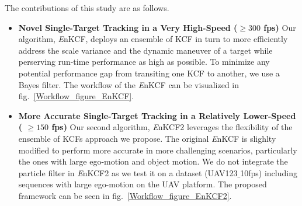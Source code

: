 \documentclass{bmvc2k}
\begin{document}
The contributions of this study are as follows.
\begin{itemize}
\item \textbf{Novel Single-Target Tracking in a Very High-Speed ($\geq300$ fps) } Our
  algorithm, {\it E}nKCF, deploys an ensemble of KCF in turn to more
  efficiently address the scale variance and the dynamic maneuver of a
  target while perserving run-time performance as high as possible. To
  minimize any potential performance gap from transiting one KCF to
  another, we use a Bayes filter. The workflow of the  {\it E}nKCF can
  be visualized in fig.~\ref{Workflow_figure_EnKCF}. 

\item \textbf{More Accurate Single-Target Tracking in a Relatively Lower-Speed ( $\geq 150$ fps)} Our second algorithm, 
{\it E}nKCF2 leverages the flexibility of the ensemble of KCFs approach we propose. The original {\it E}nKCF is slighlty
modified to perform more accurate in more challenging scenarios, particularly the ones with large ego-motion and object
motion. We do not integrate the particle filter in {\it E}nKCF2 as we test it on a dataset (UAV123$\_$10fps) including sequences
with large ego-motion on the UAV platform. The proposed framework can be seen in fig.~\ref{Workflow_figure_EnKCF2}.

\end{itemize}
\end{document}

